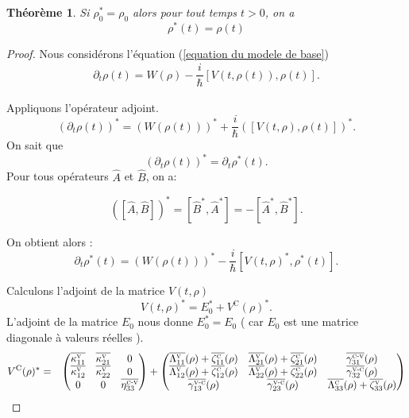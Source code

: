 \documentclass[12pt,a4paper,openany,oneside]{book}
\newtheorem{theorem}{Théorème}[chapter]
\begin{document}
{{{{{{\begin{theorem}
Si $ \rho_{0}^{*} = \rho_{0} $ alors pour tout temps $t>0$, on a
$$ \rho^{*}(t) = \rho(t) $$
\end{theorem}

\begin{proof}
Nous considérons l'équation (\ref{equation du modele de base})
\begin{eqnarray*}
\partial_{t}\rho(t)  = W(\rho)-\dfrac{i}{\hbar}\left[V(t,\rho(t)),\rho(t)\right].
\end{eqnarray*}

Appliquons l'opérateur adjoint.
 $$  
\left(\partial_{t}\rho(t)\right)^{*} = \left(W(\rho(t))\right)^{*} + \dfrac{i}{\hbar}\left([V(t,\rho),\rho(t)]\right)^{*}.
$$
On sait que 
$$ \left(\partial_{t}\rho(t)\right)^{*} = \partial_{t}\rho^{*}(t).$$  
Pour tous opérateurs $ \hat{A} $ et $ \hat{B} $, on a:

$$
\left(\left[\hat{A},\hat{B}\right]\right)^{*} = \left[\hat{B}^{*},\hat{A}^{*}\right] = -\left[\hat{A}^{*},\hat{B}^{*}\right].
$$

On obtient alors :
$$  
\partial_{t}\rho^{*}(t) = \left(W(\rho(t))\right)^{*} - \dfrac{i}{\hbar}[V(t,\rho)^{*},\rho^{*}(t)].
$$
 
Calculons l'adjoint de la matrice $ V(t,\rho)$\\
 \begin{equation}\label{adjoint de V}
  V(t,\rho)^{*} = E_{0}^{*} + V^{\textrm{C}}(\rho)^{*}.
\end{equation}  
L'adjoint de la matrice $ E_{0} $ nous donne  $ E_{0}^{*} = E_{0} $ ( car $ E_{0} $ est une matrice diagonale à valeurs réelles ).
\medskip
  \begin{eqnarray*}
  V^{\textrm{C}}(\rho)^{*}  
 & = & \begin{pmatrix}
                            \overline{\kappa^{\textsc{v}}_{11}} & \overline{\kappa^{\textsc{v}}_{21}}   &          0 \\
                            \overline{\kappa^{\textsc{v}}_{12}} & \overline{\kappa^{\textsc{v}}_{22}}   &          0 \\
                                     0          &        0              &   \overline{\eta^{\textsc{c-v}}_{33}}
         \end{pmatrix}  + \begin{pmatrix}
\overline{\Lambda^{\textsc{v}}_{11}}(\rho)+\overline{\zeta^{\textsc{c}}_{11}}(\rho) & \overline{\Lambda^{\textsc{v}}_{21}}(\rho)+\overline{\zeta^{\textsc{c}}_{21}}(\rho)   & \overline{\gamma^{\textsc{c-v}}_{31}}(\rho)\\
\overline{\Lambda^{\textsc{v}}_{12}}(\rho)+\overline{\zeta^{\textsc{c}}_{12}}(\rho) & \overline{\Lambda^{\textsc{v}}_{22}}(\rho)+ \overline{\zeta^{\textsc{c}}_{22}}(\rho)   & \overline{\gamma^{\textsc{v-c}}_{32}}(\rho)\\
\overline{\gamma^{\textsc{v-c}}_{13}}(\rho)& \overline{\gamma^{\textsc{v-c}}_{23}}(\rho) & \overline{\Lambda^{\textsc{c}}_{33}}(\rho)+ \overline{\zeta^{\textsc{v}}_{33}}(\rho)
         \end{pmatrix}
  \end{eqnarray*} 
  

\end{proof}}}}}}}
\end{document}
